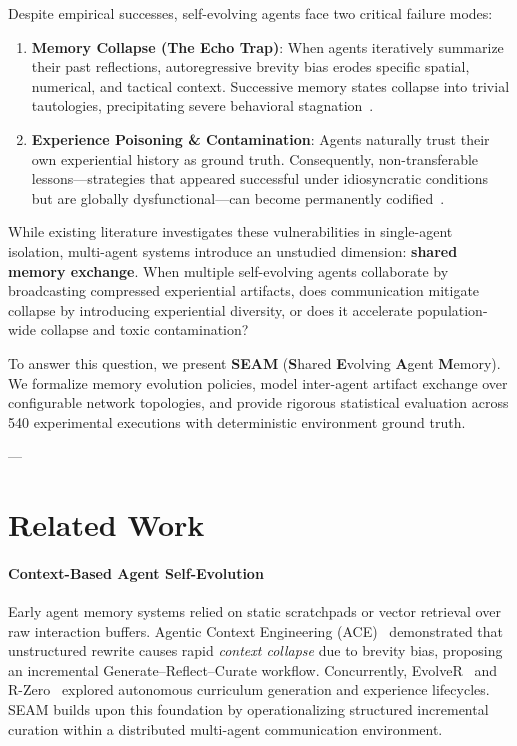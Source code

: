\documentclass[11pt,a4paper]{article}
\begin{document}
Despite empirical successes, self-evolving agents face two critical failure modes:
\begin{enumerate}
    \item \textbf{Memory Collapse (The Echo Trap)}: When agents iteratively summarize their past reflections, autoregressive brevity bias erodes specific spatial, numerical, and tactical context. Successive memory states collapse into trivial tautologies, precipitating severe behavioral stagnation~\cite{zhang2026ace,wang2025ragen}.
    \item \textbf{Experience Poisoning \& Contamination}: Agents naturally trust their own experiential history as ground truth. Consequently, non-transferable lessons—strategies that appeared successful under idiosyncratic conditions but are globally dysfunctional—can become permanently codified~\cite{oep2026,zombie2026}.
\end{enumerate}

While existing literature investigates these vulnerabilities in single-agent isolation, multi-agent systems introduce an unstudied dimension: \textbf{shared memory exchange}. When multiple self-evolving agents collaborate by broadcasting compressed experiential artifacts, does communication mitigate collapse by introducing experiential diversity, or does it accelerate population-wide collapse and toxic contamination?

To answer this question, we present \textbf{SEAM} (\textbf{S}hared \textbf{E}volving \textbf{A}gent \textbf{M}emory). We formalize memory evolution policies, model inter-agent artifact exchange over configurable network topologies, and provide rigorous statistical evaluation across 540 experimental executions with deterministic environment ground truth.

---

\section{Related Work}
\label{sec:related}

\paragraph{Context-Based Agent Self-Evolution}
Early agent memory systems relied on static scratchpads or vector retrieval over raw interaction buffers. Agentic Context Engineering (ACE)~\cite{zhang2026ace} demonstrated that unstructured rewrite causes rapid \emph{context collapse} due to brevity bias, proposing an incremental Generate--Reflect--Curate workflow. Concurrently, EvolveR~\cite{wu2026evolver} and R-Zero~\cite{huang2026rzero} explored autonomous curriculum generation and experience lifecycles. SEAM builds upon this foundation by operationalizing structured incremental curation within a distributed multi-agent communication environment.
\end{document}
